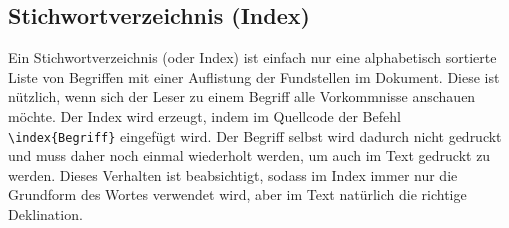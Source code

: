 \subsection{Stichwortverzeichnis (Index)}%
%
%
\label{sec:Index}
%
Ein Stichwortverzeichnis (oder
Index)
ist einfach nur eine alphabetisch sortierte Liste von Begriffen mit einer Auflistung der Fundstellen im Dokument.
Diese ist nützlich, wenn sich der Leser zu einem Begriff alle Vorkommnisse anschauen möchte.
Der Index wird erzeugt, indem im Quellcode der Befehl \lstinline+\index{Begriff}+
eingefügt wird. Der Begriff selbst wird dadurch nicht gedruckt und muss daher
noch einmal wiederholt werden, um auch im Text gedruckt zu werden. Dieses Verhalten
ist beabsichtigt, sodass im Index immer nur die Grundform des Wortes verwendet
wird, aber im Text natürlich die richtige Deklination.
